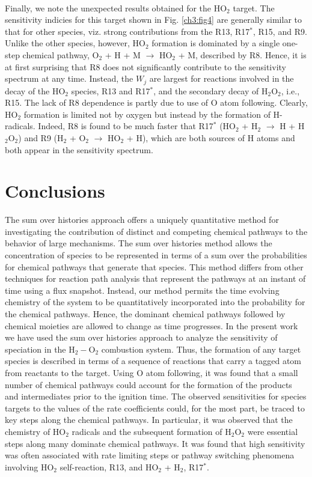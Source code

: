 \paragraph{}
Finally, we note the unexpected results obtained for the HO$_2$
target. The sensitivity indicies for this target shown in Fig. \ref{ch3:fig4}
are generally similar to that for other species, viz. strong
contributions from the R13, R17$^{\ast}$, R15, and R9. Unlike the
other species, however, HO$_2$ formation is dominated by a single
one-step chemical pathway, O$_2$ + H + M $\rightarrow$ HO$_2$ + M,
described by R8. Hence, it is at first surprising that R8 does not
significantly contribute to the sensitivity spectrum at any time.
Instead, the $W_j$ are largest for reactions involved in the decay of the HO$_2$ species, R13 and R17$^{\ast}$, and the secondary decay of
H$_2$O$_2$, i.e., R15. The lack of R8 dependence is partly due to use
of O atom following. Clearly, HO$_2$ formation is limited not by
oxygen but instead by the formation of H-radicals. Indeed, R8 is
found to be much faster that R17$^{\ast}$ (HO$_2$ + H$_2$ $\rightarrow$ H + H$_2$O$_2$)
and R9 (H$_2$ + O$_2$ $\rightarrow$ HO$_2$ + H), which are both sources of H
atoms and both appear in the sensitivity spectrum.

\section{Conclusions}
\label{conclusions}
The sum over histories approach offers a uniquely quantitative
method for investigating the contribution of distinct and
competing chemical pathways to the behavior of large
mechanisms. The sum over histories method allows the
concentration of species to be represented in terms of a sum over the probabilities for chemical pathways that generate that
species. This method differs from other techniques for reaction
path analysis that represent the pathways at an instant of time
using a flux snapshot. Instead, our method permits the time
evolving chemistry of the system to be quantitatively
incorporated into the probability for the chemical pathways.
Hence, the dominant chemical pathways followed by chemical
moieties are allowed to change as time progresses. In the
present work we have used the sum over histories approach to
analyze the sensitivity of speciation in the H$_2-$O$_2$ combustion
system. Thus, the formation of any target species is described in
terms of a sequence of reactions that carry a tagged atom from
reactants to the target. Using O atom following, it was found
that a small number of chemical pathways could account for the
formation of the products and intermediates prior to the
ignition time. The observed sensitivities for species targets to
the values of the rate coefficients could, for the most part, be
traced to key steps along the chemical pathways. In particular, it
was observed that the chemistry of HO$_2$ radicals and the
subsequent formation of H$_2$O$_2$ were essential steps along many
dominate chemical pathways. It was found that high sensitivity
was often associated with rate limiting steps or pathway
switching phenomena involving HO$_2$ self-reaction, R13, and
HO$_2$ + H$_2$, R17$^{\ast}$.
\newline
